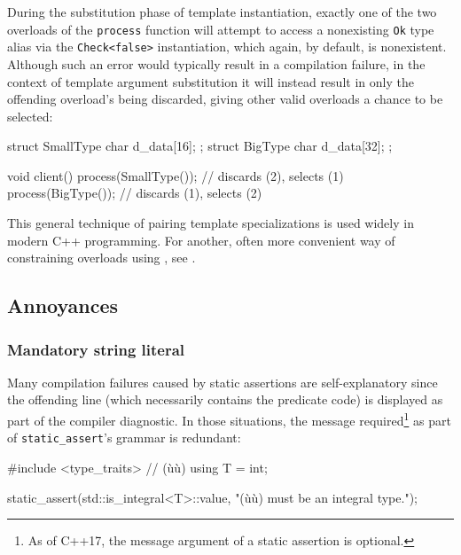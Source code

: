 During the substitution phase of template instantiation,
exactly one of the two overloads of the \lstinline!process! function will
attempt to access a nonexisting \lstinline!Ok! type alias via the
\lstinline!Check<false>! instantiation, which again, by default, is
nonexistent. Although such an error would typically result in a
compilation failure, in the context of template argument substitution it
will instead result in only the offending overload's being discarded,
giving other valid overloads a chance to be selected:

\begin{emcppshiddenlisting}[emcppsbatch=e6]
struct SmallType { char d_data[16]; };
struct BigType   { char d_data[32]; };
\end{emcppshiddenlisting}
\begin{emcppslisting}[emcppsbatch=e6]
void client()
{
    process(SmallType());  // discards (2), selects (1)
    process(BigType());    // discards (1), selects (2)
}
\end{emcppslisting}

\noindent This general technique of pairing template specializations is used widely
in modern C++ programming. For another, often more convenient way of
constraining overloads using , see
.

\subsection[Annoyances]{Annoyances}\label{static-annoyances}

\subsubsection[Mandatory string literal]{Mandatory string literal}\label{mandatory-string-literal}

Many compilation failures caused by static assertions are
self-explanatory since the offending line (which necessarily contains the
predicate code) is displayed as part of the compiler diagnostic. In
those situations, the message required{\cprotect\footnote{As of C++17,
  the message argument of a static assertion is optional.}} as part of
\lstinline!static_assert!'s grammar is redundant:

\begin{emcppshiddenlisting}[emcppsbatch=e7]
#include <type_traits>  // (ù{}ù)
using T = int;
\end{emcppshiddenlisting}
\begin{emcppslisting}[emcppsbatch=e7]
static_assert(std::is_integral<T>::value, "(ù{}ù) must be an integral type.");
\end{emcppslisting}

